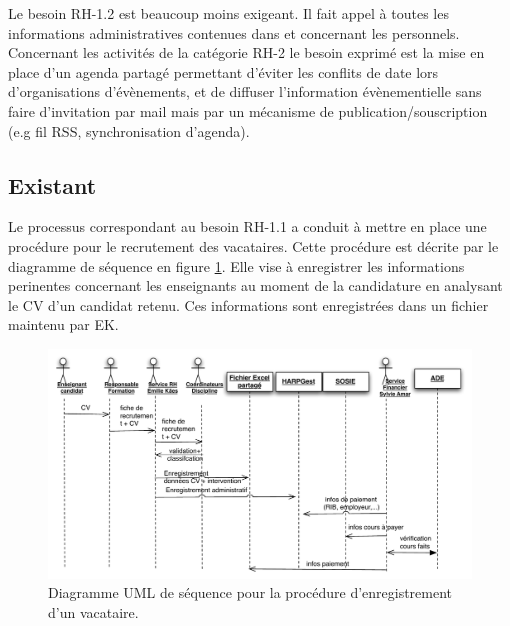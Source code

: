 \documentclass{book}
\begin{document}
Le besoin RH-1.2 est beaucoup moins exigeant. Il fait appel à toutes
les informations administratives contenues dans  
et  concernant les personnels.\\


Concernant les activités de la catégorie RH-2 le besoin exprimé 
est la mise en place d'un agenda partagé permettant d'éviter
les conflits de date lors d'organisations d'évènements, et de 
diffuser l'information évènementielle sans faire d'invitation
par mail mais par un mécanisme de publication/souscription
(e.g fil RSS, synchronisation d'agenda).  



\subsection{Existant}

Le processus correspondant au besoin RH-1.1 a conduit à mettre en
place une procédure pour le recrutement des vacataires. Cette procédure
est décrite par le diagramme de séquence en figure \ref{fg:rh_seq_vacataires}.
Elle vise à enregistrer les informations perinentes concernant les enseignants
au moment de la candidature en analysant le CV d'un candidat retenu. Ces
informations sont enregistrées dans un fichier  maintenu par EK.

\begin{figure}[hbt]
\begin{center}
\includegraphics[width=\linewidth]{figs/rh_seq_vacataires.pdf}
\end{center}
\caption{Diagramme UML de séquence pour la procédure d'enregistrement d'un vacataire.}
\label{fg:rh_seq_vacataires}
\end{figure}
\end{document}
